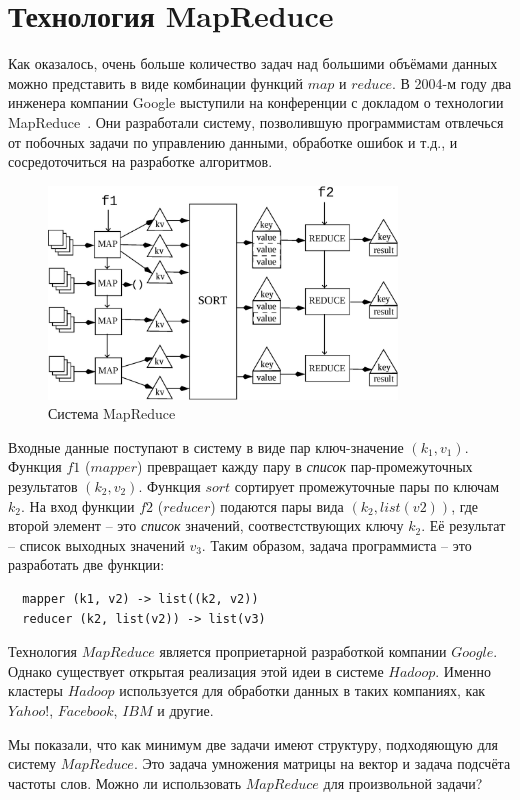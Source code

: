 \documentclass[a4paper,11pt]{article}
\begin{document}
\section{Технология MapReduce}
Как оказалось, очень больше количество задач над большими объёмами данных
можно представить в виде комбинации функций $map$ и $reduce$. В 2004-м году
два инженера компании Google выступили на конференции с докладом о технологии
MapReduce~\cite{Dean04mapreduce:simplified}. Они разработали систему,
позволившую программистам отвлечься от побочных задачи по управлению данными,
обработке ошибок и т.д., и сосредоточиться на разработке алгоритмов.
\begin{figure}[h]
    \begin{center}
        \includegraphics[width=350px]{lecture9/mapreduce.eps}
        \caption{Система MapReduce}
    \end{center}
\end{figure}
Входные данные поступают в систему в виде пар ключ-значение $(k_1, v_1)$.
Функция $f1$ ($mapper$) превращает кажду пару в \emph{список} пар-промежуточных
результатов $(k_2, v_2)$. Функция $sort$ сортирует промежуточные пары по
ключам $k_2$. На вход функции $f2$ ($reducer$) подаются пары вида 
$(k_2, list(v2))$, где второй элемент -- это \emph{список} значений,
соотвестствующих ключу $k_2$. Её результат -- список выходных значений $v_3$.
Таким образом, задача программиста -- это разработать две функции:
\begin{lstlisting}
  mapper (k1, v2) -> list((k2, v2))
  reducer (k2, list(v2)) -> list(v3)
\end{lstlisting}

Технология $MapReduce$ является проприетарной разработкой компании $Google$.
Однако существует открытая реализация этой идеи в системе $Hadoop$. Именно
кластеры $Hadoop$ используется для обработки данных в таких компаниях, как
$Yahoo!$, $Facebook$, $IBM$ и другие.

Мы показали, что как минимум две задачи имеют структуру, подходяющую для
систему $MapReduce$. Это задача умножения матрицы на вектор и задача
подсчёта частоты слов. Можно ли использовать $MapReduce$ для произвольной
задачи?
\end{document}
